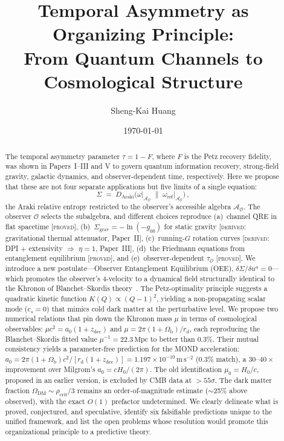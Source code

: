 \documentclass[prd,twocolumn,superscriptaddress,longbibliography,floatfix]{revtex4-2}
\newcommand{\tauasym}{\tau}
\newcommand{\Sgrav}{\Sigma_{\mathrm{grav}}}
\newcommand{\Daraki}{D_{\mathrm{Araki}}}
\newcommand{\Aobs}{\mathcal{A}_{\mathcal{O}}}
\newcommand{\tauO}{\tauasym_{\mathcal{O}}}
\newcommand{\OmDM}{\Omega_{\mathrm{DM}}}
\begin{document}
\title{Temporal Asymmetry as Organizing Principle:\\
From Quantum Channels to Cosmological Structure}

\author{Sheng-Kai Huang}

\date{\today}

\begin{abstract}
The temporal asymmetry parameter $\tauasym = 1 - F$,
where $F$ is the Petz recovery fidelity, was shown in
Papers~I--III and V to govern quantum information recovery,
strong-field gravity, galactic dynamics, and observer-dependent
time, respectively.  Here we propose that these are not four
separate applications but five limits of a single equation:
\begin{equation*}
\Sigma \;=\; \Daraki\!\bigl(\omega\big|_{\Aobs}
\;\big\|\; \omega_{\mathrm{ref}}\big|_{\Aobs}\bigr)\,,
\end{equation*}
the Araki relative entropy restricted to the observer's
accessible algebra $\Aobs$.  The observer $\mathcal{O}$
selects the subalgebra, and different choices reproduce
(a)~channel QRE in flat spacetime [\textsc{proved}],
(b)~$\Sgrav = -\ln(-g_{00})$ for static gravity
[\textsc{derived}: gravitational thermal attenuator,
Paper~II],
(c)~running-$G$ rotation curves [\textsc{derived}: DPI
$+$ extensivity $\Rightarrow$ $\eta = 1$, Paper~III],
(d)~the Friedmann equations from entanglement equilibrium
[\textsc{proved}], and
(e)~observer-dependent $\tauO$ [\textsc{proved}].
We introduce a new postulate---Observer Entanglement
Equilibrium (OEE), $\delta\Sigma/\delta u^a = 0$---which promotes
the observer's 4-velocity to a dynamical field structurally
identical to the Khronon of Blanchet--Skordis
theory~\cite{BlanchetSkordis2024}.  The Petz-optimality
principle suggests a quadratic kinetic function $K(Q) \propto
(Q-1)^2$, yielding a non-propagating scalar mode ($c_s = 0$) that
mimics cold dark matter at the perturbative level.  We propose
two numerical relations that pin down the Khronon mass
$\mu$ in terms of cosmological observables:
$\mu c^2 = a_0(1+z_{\mathrm{dec}})$ and
$\mu = 2\pi(1+\Omega_{\mathrm{b}})/r_{\mathrm{d}}$,
each reproducing the Blanchet--Skordis fitted value
$\mu^{-1} = 22.3\,\mathrm{Mpc}$ to better than $0.3\%$.
Their mutual consistency yields a parameter-free prediction
for the MOND acceleration:
$a_0 = 2\pi(1+\Omega_{\mathrm{b}})c^2/
[r_{\mathrm{d}}(1+z_{\mathrm{dec}})]
= 1.197 \times 10^{-10}\,\mathrm{m\,s}^{-2}$
($0.3\%$ match), a $30$--$40\times$ improvement over
Milgrom's $a_0 = cH_0/(2\pi)$.
The old identification $\mu_0 = H_0/c$, proposed in
an earlier version, is excluded by CMB data at $>55\sigma$.
The dark matter fraction $\OmDM \sim \rho_{\mathrm{crit}}/3$
remains an order-of-magnitude estimate ($\sim$25\% above
observed), with the exact $O(1)$ prefactor undetermined.
We clearly delineate what is proved, conjectured, and
speculative, identify six falsifiable predictions unique to the
unified framework, and list the open problems whose resolution
would promote this organizational principle to a predictive theory.
\end{abstract}
\end{document}

